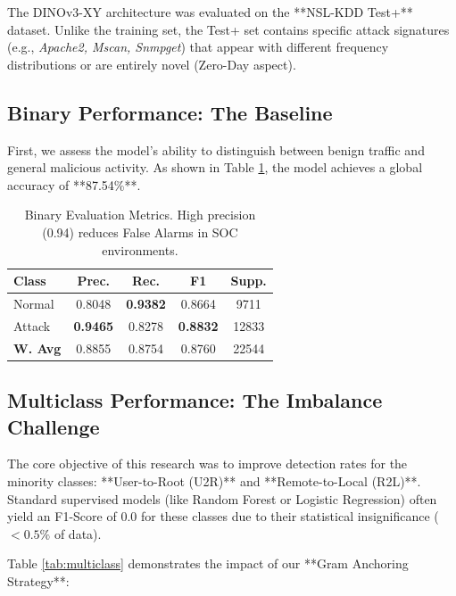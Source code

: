 \documentclass[
  10pt,
  twocolumn,
  a4paper,
  parskip=half
]{scrartcl}
\begin{document}
    The DINOv3-XY architecture was evaluated on the **NSL-KDD Test+** dataset. Unlike the training set, the Test+ set contains specific attack signatures (e.g., \textit{Apache2, Mscan, Snmpget}) that appear with different frequency distributions or are entirely novel (Zero-Day aspect).

    \subsection{Binary Performance: The Baseline}
    First, we assess the model's ability to distinguish between benign traffic and general malicious activity. As shown in Table \ref{tab:binary}, the model achieves a global accuracy of **87.54\%**.

\begin{table}[H]
    \centering
    \renewcommand{\arraystretch}{1.2}
    \scriptsize %
    \begin{tabularx}{\columnwidth}{Xcccc} %
        \toprule
        \textbf{Class} & \textbf{Prec.} & \textbf{Rec.} & \textbf{F1} & \textbf{Supp.} \\
        \midrule
        Normal & 0.8048 & \textbf{0.9382} & 0.8664 & 9711 \\
        Attack & \textbf{0.9465} & 0.8278 & \textbf{0.8832} & 12833 \\
        \midrule
        \textbf{W. Avg} & 0.8855 & 0.8754 & 0.8760 & 22544 \\
        \bottomrule
    \end{tabularx}
    \caption{Binary Evaluation Metrics. High precision (0.94) reduces False Alarms in SOC environments.}
    \label{tab:binary}
\end{table}

    \subsection{Multiclass Performance: The Imbalance Challenge}
    The core objective of this research was to improve detection rates for the minority classes: **User-to-Root (U2R)** and **Remote-to-Local (R2L)**. Standard supervised models (like Random Forest or Logistic Regression) often yield an F1-Score of 0.0 for these classes due to their statistical insignificance ($<0.5\%$ of data).

    Table \ref{tab:multiclass} demonstrates the impact of our **Gram Anchoring Strategy**:
\end{document}
